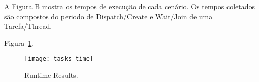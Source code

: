 	A Figura B mostra os tempos de execução de cada cenário. Os tempos
	coletados são compostos do periodo de Dispatch/Create e Wait/Join de uma
	Tarefa/Thread.

	Figura~\ref{fig:time}.
	\begin{figure}[]
			\centering
			\texttt{[image: tasks-time]}
			\caption{Runtime Results.}
			\label{fig:time}
	\end{figure}
